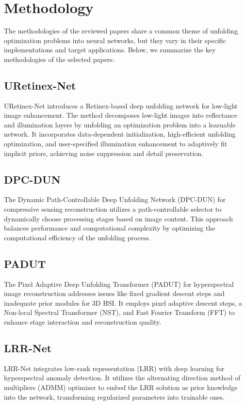 \documentclass[11pt]{article}
\begin{document}
\section{Methodology}
The methodologies of the reviewed papers share a common theme of unfolding optimization problems into neural networks, but they vary in their specific implementations and target applications. Below, we summarize the key methodologies of the selected papers:

\subsection{URetinex-Net}
URetinex-Net introduces a Retinex-based deep unfolding network for low-light image enhancement. The method decomposes low-light images into reflectance and illumination layers by unfolding an optimization problem into a learnable network. It incorporates data-dependent initialization, high-efficient unfolding optimization, and user-specified illumination enhancement to adaptively fit implicit priors, achieving noise suppression and detail preservation.

\subsection{DPC-DUN}
The Dynamic Path-Controllable Deep Unfolding Network (DPC-DUN) for compressive sensing reconstruction utilizes a path-controllable selector to dynamically choose processing stages based on image content. This approach balances performance and computational complexity by optimizing the computational efficiency of the unfolding process.

\subsection{PADUT}
The Pixel Adaptive Deep Unfolding Transformer (PADUT) for hyperspectral image reconstruction addresses issues like fixed gradient descent steps and inadequate prior modules for 3D HSI. It employs pixel adaptive descent steps, a Non-local Spectral Transformer (NST), and Fast Fourier Transform (FFT) to enhance stage interaction and reconstruction quality.

\subsection{LRR-Net}
LRR-Net integrates low-rank representation (LRR) with deep learning for hyperspectral anomaly detection. It utilizes the alternating direction method of multipliers (ADMM) optimizer to embed the LRR solution as prior knowledge into the network, transforming regularized parameters into trainable ones.
\end{document}
